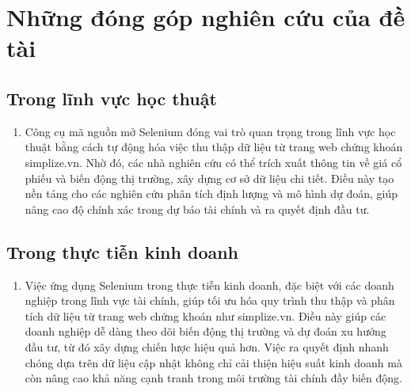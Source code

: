 \section{Những đóng góp nghiên cứu của đề tài}
\subsection{Trong lĩnh vực học thuật}
\begin{enumerate}
    \item []
    \hspace*{0.7cm}Công cụ mã nguồn mở Selenium đóng vai trò quan trọng trong lĩnh vực học thuật bằng cách tự động hóa việc thu thập dữ liệu từ trang web chứng khoán simplize.vn. Nhờ đó, các nhà nghiên cứu có thể trích xuất thông tin về giá cổ phiếu và biến động thị trường, xây dựng cơ sở dữ liệu chi tiết. Điều này tạo nền tảng cho các nghiên cứu phân tích định lượng và mô hình dự đoán, giúp nâng cao độ chính xác trong dự báo tài chính và ra quyết định đầu tư.
\end{enumerate}

\subsection{Trong thực tiễn kinh doanh}
\begin{enumerate}
    \item []
    \hspace*{0.7cm}Việc ứng dụng Selenium trong thực tiễn kinh doanh, đặc biệt với các doanh nghiệp trong lĩnh vực tài chính, giúp tối ưu hóa quy trình thu thập và phân tích dữ liệu từ trang web chứng khoán như simplize.vn. Điều này giúp các doanh nghiệp dễ dàng theo dõi biến động thị trường và dự đoán xu hướng đầu tư, từ đó xây dựng chiến lược hiệu quả hơn. Việc ra quyết định nhanh chóng dựa trên dữ liệu cập nhật không chỉ cải thiện hiệu suất kinh doanh mà còn nâng cao khả năng cạnh tranh trong môi trường tài chính đầy biến động.
\end{enumerate}